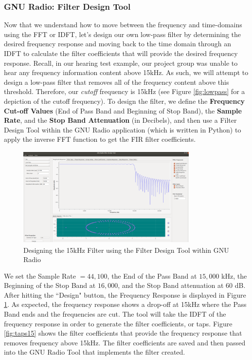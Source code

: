 \subsubsection{GNU Radio: Filter Design Tool}

Now that we understand how to move between the frequency and time-domains using the FFT or IDFT, let's design our own low-pass filter by determining the desired frequency response and moving back to the time domain through an IDFT to calculate the filter coefficients that will provide the desired frequency response.  Recall, in our hearing test example, our project group was unable to hear any frequency information content above 15kHz.  As such, we will attempt to design a low-pass filter that removes all of the frequency content above this threshold.  Therefore, our \textit{cutoff} frequency is 15kHz (see Figure \ref{fig:lowpass} for a depiction of the cutoff frequency).  To design the filter, we define the  \textbf{Frequency Cut-off Values} (End of Pass Band and Beginning of Stop Band), the \textbf{Sample Rate}, and the \textbf{Stop Band Attenuation} (in Decibels), and then use a Filter Design Tool within the GNU Radio application (which is written in Python) to apply the inverse FFT function to get the FIR filter coefficients.  

\begin{figure}[h!]
	\centering
	\includegraphics[height = 5cm, width =9cm]{filter_tool_15kHz.png} %
	\caption{Designing the 15kHz Filter using the Filter Design Tool within GNU Radio}
	\label{fig:mainfilt}
\end{figure}  

We set the Sample Rate $= 44,100$, the End of the Pass Band at  $15,000$ kHz, the Beginning of the Stop Band at $16,000$, and the Stop Band attenuation at $60$ dB.  After hitting the ``Design" button, the Frequency Response is displayed in Figure \ref{fig:mainfilt}.  As expected, the frequency response shows a drop-off at 15kHz where the Pass Band ends and the frequencies are cut.  The tool will take the IDFT of the frequency response in order to generate the filter coefficients, or taps.  Figure \ref{fig:taps15} shows the filter coefficients that provide the frequency response that removes frequency above 15kHz.  The filter coefficients are saved and then passed into the GNU Radio Tool that implements the filter created.      

